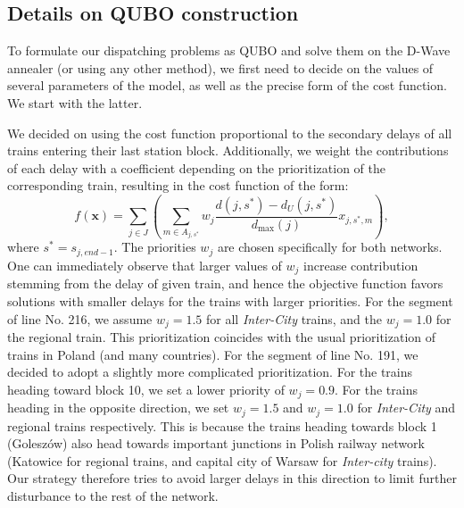 \subsection{Details on QUBO construction}

To formulate our dispatching problems as QUBO and solve them on the D-Wave annealer
(or using any other method), we first need to decide on the values of several parameters
of the model, as well as the precise form of the cost function. We start with the latter.

We decided on using the cost function proportional to the secondary delays of all trains
entering their last station block. Additionally, we weight the contributions of each delay with
a coefficient depending on the prioritization of the corresponding train, resulting in the cost
function of the form:
\begin{equation}
  f(\mathbf{x}) = \sum_{j \in J}\left(\sum_{m  \in A_{j,s^{*}}}w_{j} \frac{d(j,s^{*}) - d_{U}(j,s^{*})}{d_{\max}(j)}x_{j,s^{*},m}\right),
\end{equation}
where $s^{*} = s_{j,end-1}$. The priorities $w_{j}$ are chosen specifically for both networks. One can immediately observe that larger values of $w_{j}$ increase contribution stemming from the delay of given train, and hence the objective function favors solutions with smaller delays for the trains with larger priorities. For the segment of line No. 216, we assume $w_{j}= 1.5$ for all \emph{Inter-City} trains, and the $w_{j}=1.0$ for the regional train. This prioritization coincides with the usual prioritization
of trains in Poland (and many countries). For the segment of line No. 191, we decided to adopt a slightly more complicated prioritization. For the trains heading toward block 10, we set a lower priority of $w_{j}=0.9$. For the trains heading in the opposite direction, we set $w_{j}=1.5$ and $w_{j}=1.0$ for \emph{Inter-City} and regional trains respectively. This is because the trains heading towards block 1 (Goleszów) also head towards important junctions in Polish railway network (Katowice for regional trains, and capital city of Warsaw for \emph{Inter-city} trains). Our strategy therefore tries to avoid larger delays in this direction to limit further disturbance to the rest of the network.

